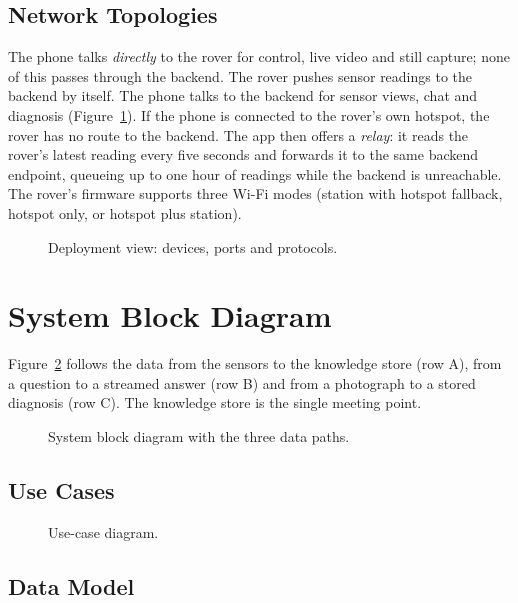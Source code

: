 \subsection{Network Topologies}

The phone talks \emph{directly} to the rover for control, live video and still capture; none of this passes through the backend.
The rover pushes sensor readings to the backend by itself. The phone talks to the backend for sensor views, chat and
diagnosis (Figure~\ref{fig:deployment}). If the phone is connected to the rover's own hotspot, the rover has no route to the
backend. The app then offers a \emph{relay}: it reads the rover's latest reading every five seconds and forwards it to the same
backend endpoint, queueing up to one hour of readings while the backend is unreachable. The rover's firmware supports three
Wi-Fi modes (station with hotspot fallback, hotspot only, or hotspot plus station).

\begin{figure}[H]
\centering

\caption{Deployment view: devices, ports and protocols.}
\label{fig:deployment}
\end{figure}

\section{System Block Diagram}

Figure~\ref{fig:blockdiagram} follows the data from the sensors to the knowledge store (row A), from a question to a streamed
answer (row B) and from a photograph to a stored diagnosis (row C). The knowledge store is the single meeting point.

\begin{figure}[H]
\centering

\caption{System block diagram with the three data paths.}
\label{fig:blockdiagram}
\end{figure}

\subsection{Use Cases}

\begin{figure}[H]
\centering

\caption{Use-case diagram.}
\label{fig:usecase}
\end{figure}

\subsection{Data Model}

